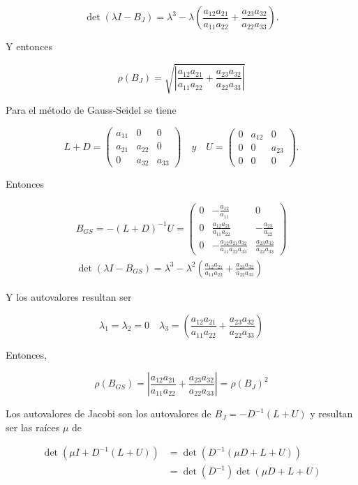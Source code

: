 \documentclass[10pt]{article}
\begin{document}
$$
\operatorname{det}\left(\lambda I-B_{J}\right)=\lambda^{3}-\lambda\left(\frac{a_{12} a_{21}}{a_{11} a_{22}}+\frac{a_{23} a_{32}}{a_{22} a_{33}}\right) .
$$

Y entonces

$$
\rho\left(B_{J}\right)=\sqrt{\left|\frac{a_{12} a_{21}}{a_{11} a_{22}}+\frac{a_{23} a_{32}}{a_{22} a_{33}}\right|}
$$

Para el método de Gauss-Seidel se tiene

$$
L+D=\left(\begin{array}{ccc}
a_{11} & 0 & 0 \\
a_{21} & a_{22} & 0 \\
0 & a_{32} & a_{33}
\end{array}\right) \quad y \quad U=\left(\begin{array}{ccc}
0 & a_{12} & 0 \\
0 & 0 & a_{23} \\
0 & 0 & 0
\end{array}\right) .
$$

Entonces

$$
\begin{gathered}
B_{G S}=-(L+D)^{-1} U=\left(\begin{array}{ccc}
0 & -\frac{a_{12}}{a_{11}} & 0 \\
0 & \frac{a_{12} a_{21}}{a_{11} a_{22}} & -\frac{a_{23}}{a_{22}} \\
0 & -\frac{a_{12} a_{21} a_{32}}{a_{11} a_{22} a_{33}} & \frac{a_{23} a_{32}}{a_{22} a_{33}}
\end{array}\right) \\
\operatorname{det}\left(\lambda I-B_{G S}\right)=\lambda^{3}-\lambda^{2}\left(\frac{a_{12} a_{21}}{a_{11} a_{22}}+\frac{a_{23} a_{32}}{a_{22} a_{33}}\right)
\end{gathered}
$$

Y los autovalores resultan ser

$$
\lambda_{1}=\lambda_{2}=0 \quad \lambda_{3}=\left(\frac{a_{12} a_{21}}{a_{11} a_{22}}+\frac{a_{23} a_{32}}{a_{22} a_{33}}\right)
$$

Entonces,

$$
\rho\left(B_{G S}\right)=\left|\frac{a_{12} a_{21}}{a_{11} a_{22}}+\frac{a_{23} a_{32}}{a_{22} a_{33}}\right|=\rho\left(B_{J}\right)^{2}
$$

Los autovalores de Jacobi son los autovalores de $B_{J}=-D^{-1}(L+U)$ y resultan ser las raíces $\mu$ de

$$
\begin{aligned}
\operatorname{det}\left(\mu I+D^{-1}(L+U)\right) & =\operatorname{det}\left(D^{-1}(\mu D+L+U)\right) \\
& =\operatorname{det}\left(D^{-1}\right) \operatorname{det}(\mu D+L+U)
\end{aligned}
$$
\end{document}

